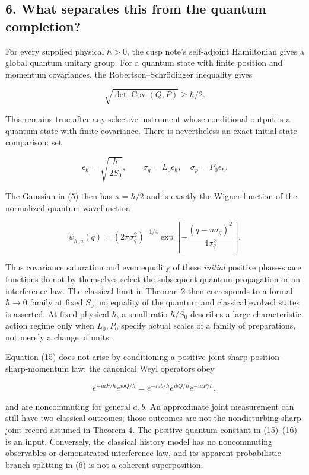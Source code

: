 \documentclass[11pt,a4paper]{article}
\begin{document}
\hypertarget{what-separates-this-from-the-quantum-completion}{%
\subsection{6. What separates this from the quantum
completion?}\label{what-separates-this-from-the-quantum-completion}}

For every supplied physical \(\hbar>0\), the cusp note's self-adjoint
Hamiltonian gives a global quantum unitary group. For a quantum state
with finite position and momentum covariances, the
Robertson--Schrödinger inequality gives

\[
 \sqrt{\det\operatorname{Cov}(Q,P)}\ge\hbar/2. \tag{15}
\]

This remains true after any selective instrument whose conditional
output is a quantum state with finite covariance. There is nevertheless
an exact initial-state comparison: set

\[
 \epsilon_\hbar=\sqrt{\frac{\hbar}{2S_0}},\qquad
 \sigma_q=L_0\epsilon_\hbar,\quad
 \sigma_p=P_0\epsilon_\hbar. \tag{15a}
\]

The Gaussian in (5) then has \(\kappa=\hbar/2\) and is exactly the
Wigner function of the normalized quantum wavefunction

\[
 \psi_{\hbar,u}(q)=(2\pi\sigma_q^2)^{-1/4}
 \exp\!\left[-\frac{(q-u\sigma_q)^2}{4\sigma_q^2}\right]. \tag{15b}
\]

Thus covariance saturation and even equality of these \emph{initial}
positive phase-space functions do not by themselves select the
subsequent quantum propagation or an interference law. The classical
limit in Theorem 2 then corresponds to a formal \(\hbar\to0\) family at
fixed \(S_0\); no equality of the quantum and classical evolved states
is asserted. At fixed physical \(\hbar\), a small ratio \(\hbar/S_0\)
describes a large-characteristic-action regime only when \(L_0,P_0\)
specify actual scales of a family of preparations, not merely a change
of units.

Equation (15) does not arise by conditioning a positive joint
sharp-position--sharp-momentum law: the canonical Weyl operators obey

\[
 e^{-iaP/\hbar}e^{ibQ/\hbar}
   =e^{-iab/\hbar}e^{ibQ/\hbar}e^{-iaP/\hbar}, \tag{16}
\]

and are noncommuting for general \(a,b\). An approximate joint
measurement can still have two classical outcomes; those outcomes are
not the nondisturbing sharp joint record assumed in Theorem 4. The
positive quantum constant in (15)--(16) is an input. Conversely, the
classical history model has no noncommuting observables or demonstrated
interference law, and its apparent probabilistic branch splitting in (6)
is not a coherent superposition.
\end{document}
